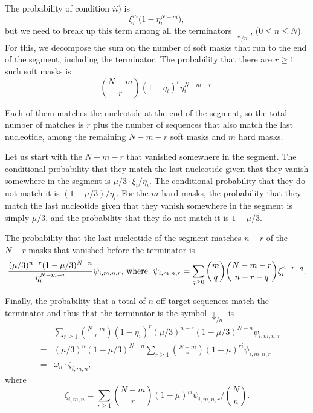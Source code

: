 \documentclass{article}
\begin{document}
The probability of condition $ii)$ is
\begin{equation*}
\xi_i^m \Big(1 - \eta_i^{N-m} \Big),
\end{equation*}
but we need to break up this term among all the terminators
$\downarrow_{/n}$, ($0 \leq n \leq N$). For this, we decompose the sum on
the number of soft masks that run to the end of the segment, including the
terminator. The probability that there are $r \geq 1$ such soft masks is
\begin{equation*}
{N-m \choose r} (1 - \eta_i)^r \eta_i^{N-m-r}.
\end{equation*}

Each of them matches the nucleotide at the end of the segment, so the
total number of matches is $r$ plus the number of sequences that also
match the last nucleotide, among the remaining $N-m-r$ soft masks and $m$
hard masks.

Let us start with the $N-m-r$ that vanished somewhere in the segment. The
conditional probability that they match the last nucleotide given that
they vanish somewhere in the segment is $\mu/3 \cdot \xi_i / \eta_i$. The
conditional probability that they do not match it is $(1-\mu/3) / \eta_i$.
For the $m$ hard masks, the probability that they match the last
nucleotide given that they vanish somewhere in the segment is simply
$\mu/3$, and the probability that they do not match it is $1-\mu/3$.

The probability that the last nucleotide of the segment matches $n-r$ of
the $N-r$ masks that vanished before the terminator is
\begin{equation*}
\frac{(\mu/3)^{n-r}(1-\mu/3)^{N-n}}{\eta_i^{N-m-r}}
\psi_{i,m,n,r}\text{, where \;}
\psi_{i,m,n,r} = \sum_{q \geq 0}{m \choose q}{N-m-r \choose n-r-q}
\xi_i^{n-r-q}.
\end{equation*}


Finally, the probability that a total of $n$ off-target sequences match
the terminator and thus that the terminator is the symbol
$\downarrow_{/n}$ is
\begin{eqnarray*}
&\;& \sum_{r\geq1} {N-m \choose r}
(1 - \eta_i)^r (\mu/3)^{n-r} (1-\mu/3)^{N-n} \psi_{i,m,n,r} \\
&=& (\mu/3)^n(1-\mu/3)^{N-n} \sum_{r\geq1} {N-m \choose r}
  (1 - \mu)^{ri} \psi_{i,m,n,r} \\
&=& \omega_n \cdot \zeta_{i,m,n},
\end{eqnarray*}
where
\begin{equation}
\label{eq:zeta}
\zeta_{i,m,n} = \sum_{r\geq1} {N-m \choose r}
(1-\mu)^{ri} \psi_{i,m,n,r} \bigg/ {N \choose n}.
\end{equation}
\end{document}
